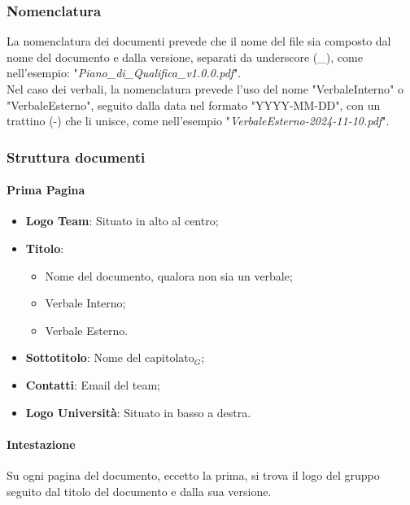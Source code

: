 \documentclass[10pt]{article}
\begin{document}
\begin{justify}
    \subsubsection{Nomenclatura}
    La nomenclatura dei documenti prevede che il nome del file sia composto dal nome del documento e dalla versione, separati da underscore (\_), come nell'esempio: "\textit{Piano\_di\_Qualifica\_v1.0.0.pdf}".\\
    Nel caso dei verbali, la nomenclatura prevede l'uso del nome "VerbaleInterno" o "VerbaleEsterno", seguito dalla data nel formato "YYYY-MM-DD", con un trattino (-) che li unisce, come nell'esempio "\textit{VerbaleEsterno-2024-11-10.pdf}".\\

    \subsubsection{Struttura documenti}

        \paragraph{Prima Pagina}
        \begin{itemize}
            \item \textbf{Logo Team}: Situato in alto al centro;
            \item \textbf{Titolo}: \begin{itemize}
            \item Nome del documento, qualora non sia un verbale;
            \item Verbale Interno;
            \item Verbale Esterno.
            \end{itemize}
            \item\textbf{Sottotitolo}: Nome del capitolato$_G$;
            \item\textbf{Contatti}: Email del team;
            \item\textbf{Logo Università}: Situato in basso a destra.
        \end{itemize}

        \paragraph{Intestazione}
        Su ogni pagina del documento, eccetto la prima, si trova il logo del gruppo seguito dal titolo del documento e dalla sua versione.\\


\end{justify}
\end{document}
